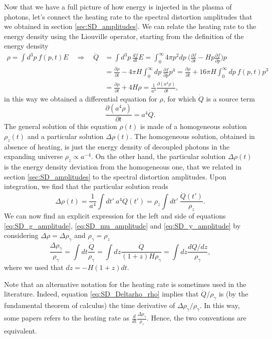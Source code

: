 Now that we have a full picture of how energy is injected in the plasma of photons, let's connect the heating rate to the spectral distortion amplitudes that we obtained in section \ref{sec:SD_amplitudes}. We can relate the heating rate to the energy density using the Liouville operator, starting from the definition of the energy density
\begin{align*}
    \rho = \int d^3p\ f(p,t)E\quad \Rightarrow\quad \dot{Q}&=\int d^3p\ \frac{df}{dt} E=\int_0^\infty 4\pi p^2dp\ \bigg(\frac{\partial f}{\partial t}-Hp\frac{\partial f}{\partial p}\bigg)p\\
    &=\frac{\partial \rho}{\partial t} -4\pi H\int_0^\infty  dp\ \frac{\partial f}{\partial p}p^4=\frac{\partial \rho}{\partial t} +16\pi H\int_0^\infty  dp\ f(p,t)p^3\\&=\frac{\partial \rho}{\partial t} +4H\rho=\frac{1}{a^4}\frac{\partial (a^4 \rho)}{\partial t},
\end{align*}
in this way we obtained a differential equation for $\rho$, for which $\dot{Q}$ is a source term
\begin{equation*}
    \frac{\partial (a^4 \rho)}{\partial t}=a^4\dot{Q}.
\end{equation*}
The general solution of this equation $\rho(t)$ is made of a homogeneous solution $\rho_z(t)$ and a particular solution $\Delta\rho(t)$. The homogeneous solution, obtained in absence of heating, is just the energy density of decoupled photons in the expanding universe $\rho_z\propto a^{-4}$. On the other hand, the particular solution $\Delta\rho(t)$ is the energy density deviation from the homogeneous one, that we related in section \ref{sec:SD_amplitudes} to the spectral distortion amplitudes. Upon integration, we find that the particular solution reads
$$\Delta\rho(t)=\frac{1}{a^4}\int dt'\ a^4\dot{Q}(t')=\rho_z\int dt'\ \frac{\dot{Q}(t')}{\rho_z}.$$
We can now find an explicit expression for the left and side of equations \eqref{eq:SD_g_amplitude}, \eqref{eq:SD_mu_amplitude} and \eqref{eq:SD_y_amplitude} by considering $\Delta\rho=\Delta\rho_\gamma$ and $\rho_\gamma=\rho_z$
\begin{equation}
    \frac{\Delta \rho_\gamma}{\rho_\gamma}=\int dt\frac{\dot Q}{\rho_\gamma}=\int dz\frac{\dot Q}{(1+z)H\rho_\gamma}=\int dz\frac{dQ/dz}{\rho_\gamma},\label{eq:SD_Deltarho_rho}
\end{equation}
where we used that $dz=-H(1+z)dt$.

Note that an alternative notation for the heating rate is sometimes used in the literature. Indeed, equation \eqref{eq:SD_Deltarho_rho} implies that $\dot Q/\rho_\gamma$ is (by the fundamental theorem of calculus) the time derivative of $\Delta\rho_\gamma/\rho_\gamma$. In this way, some papers refers to the heating rate as $\frac{d}{dt}\frac{\Delta \rho_\gamma}{\rho_\gamma}$. Hence, the two conventions are equivalent.
